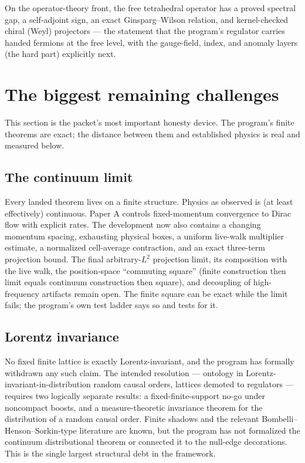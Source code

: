 \documentclass[11pt]{article}
\begin{document}
On the operator-theory front, the free tetrahedral operator has a proved
spectral gap, a self-adjoint sign, an exact Ginsparg--Wilson relation, and
kernel-checked chiral (Weyl) projectors --- the statement that the
program's regulator carries handed fermions at the free level, with the
gauge-field, index, and anomaly layers (the hard part) explicitly next.

\section{The biggest remaining challenges}\label{sec:challenges}

This section is the packet's most important honesty device.  The program's
finite theorems are exact; the distance between them and established
physics is real and measured below.

\subsection{The continuum limit}

Every landed theorem lives on a finite structure.  Physics as observed is
(at least effectively) continuous.  Paper A controls fixed-momentum
convergence to Dirac flow with explicit rates.  The development now also
contains a changing momentum spacing, exhausting physical boxes, a uniform
live-walk multiplier estimate, a normalized cell-average contraction, and
an exact three-term projection bound.  The final arbitrary-$L^2$ projection
limit, its composition with the live walk, the position-space ``commuting
square'' (finite construction then limit equals continuum construction then
square), and decoupling of high-frequency artifacts remain open.  The finite
square can be exact while the limit fails; the program's own test ladder says
so and tests for it.

\subsection{Lorentz invariance}

No fixed finite lattice is exactly Lorentz-invariant, and the program has
formally withdrawn any such claim.  The intended resolution --- ontology
in Lorentz-invariant-in-distribution random causal orders, lattices
demoted to regulators --- requires two logically separate results: a
fixed-finite-support no-go under noncompact boosts, and a measure-theoretic
invariance theorem for the distribution of a random causal order.  Finite
shadows and the relevant Bombelli--Henson--Sorkin-type literature are known,
but the program has not formalized the continuum distributional theorem or
connected it to the null-edge decorations.  This is the single largest
structural debt in the framework.
\end{document}
